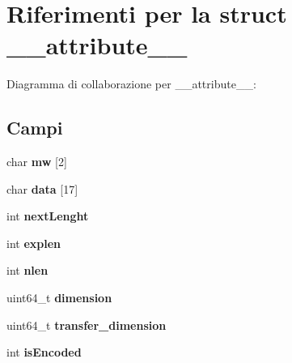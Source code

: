 \hypertarget{struct____attribute____}{}\section{Riferimenti per la struct \+\_\+\+\_\+attribute\+\_\+\+\_\+}
\label{struct____attribute____}


Diagramma di collaborazione per \+\_\+\+\_\+attribute\+\_\+\+\_\+\+:
\subsection*{Campi}
\begin{DoxyCompactItemize}
\item 
char {\bfseries mw} \mbox{[}2\mbox{]}\hypertarget{struct____attribute_____a3d9247bb10e7c18dd3756ef5eb8ef2eb}{}\label{struct____attribute_____a3d9247bb10e7c18dd3756ef5eb8ef2eb}

\item 
char {\bfseries data} \mbox{[}17\mbox{]}\hypertarget{struct____attribute_____a8fb037ff63e89b5904b3802db7aca9be}{}\label{struct____attribute_____a8fb037ff63e89b5904b3802db7aca9be}

\item 
int {\bfseries next\+Lenght}\hypertarget{struct____attribute_____aa297de498f56d873c5490432890e8ca3}{}\label{struct____attribute_____aa297de498f56d873c5490432890e8ca3}

\item 
int {\bfseries explen}\hypertarget{struct____attribute_____a10d739ca9033ae7ed3fdab3496a1c7ac}{}\label{struct____attribute_____a10d739ca9033ae7ed3fdab3496a1c7ac}

\item 
int {\bfseries nlen}\hypertarget{struct____attribute_____a654bf492f23468e09e4d753d9067e7bf}{}\label{struct____attribute_____a654bf492f23468e09e4d753d9067e7bf}

\item 
uint64\+\_\+t {\bfseries dimension}\hypertarget{struct____attribute_____a0e63b8762dab33df44c904a812dbfc21}{}\label{struct____attribute_____a0e63b8762dab33df44c904a812dbfc21}

\item 
uint64\+\_\+t {\bfseries transfer\+\_\+dimension}\hypertarget{struct____attribute_____aaeafabd3755af384b42d61957c876848}{}\label{struct____attribute_____aaeafabd3755af384b42d61957c876848}

\item 
int {\bfseries is\+Encoded}\hypertarget{struct____attribute_____ac9a61eacd692bf86568f9cec3b372b15}{}\label{struct____attribute_____ac9a61eacd692bf86568f9cec3b372b15}


\end{DoxyCompactItemize}
